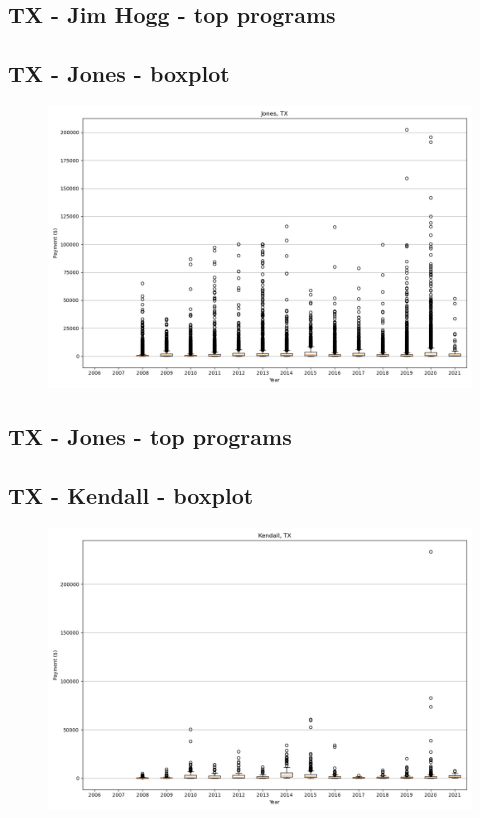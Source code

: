\subsection*{TX - Jim Hogg - top programs}

\newpage
\subsection*{TX - Jones - boxplot}
\begin{figure}[h]
\centering
\includegraphics[width=7in]{../output/boxplots/counties/Jones-TX_boxplot.png}
\end{figure}


\subsection*{TX - Jones - top programs}

\newpage
\subsection*{TX - Kendall - boxplot}
\begin{figure}[h]
\centering
\includegraphics[width=7in]{../output/boxplots/counties/Kendall-TX_boxplot.png}
\end{figure}


